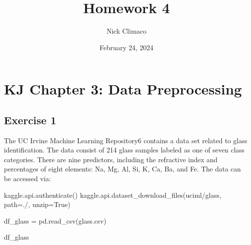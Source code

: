 \documentclass[
  11pt,
]{article}
\title{Homework 4}
\author{Nick Climaco}
\date{February 24, 2024}
\newenvironment{Shaded}{\begin{snugshade}}{\end{snugshade}}
\newcommand{\NormalTok}[1]{\textcolor[rgb]{0.00,0.23,0.31}{#1}}
\newcommand{\OperatorTok}[1]{\textcolor[rgb]{0.37,0.37,0.37}{#1}}
\newcommand{\StringTok}[1]{\textcolor[rgb]{0.13,0.47,0.30}{#1}}
\newcommand{\VariableTok}[1]{\textcolor[rgb]{0.07,0.07,0.07}{#1}}
\renewcommand*\contentsname{Table of contents}
\newcommand\contentsname{Table of contents}
\begin{document}
\maketitle

\renewcommand*\contentsname{Table of contents}
{
\hypersetup{linkcolor=}
\setcounter{tocdepth}{3}
\tableofcontents
}
\section{KJ Chapter 3: Data
Preprocessing}\label{kj-chapter-3-data-preprocessing}

\subsection{Exercise 1}\label{exercise-1}

The UC Irvine Machine Learning Repository6 contains a data set related
to glass identification. The data consist of 214 glass samples labeled
as one of seven class categories. There are nine predictors, including
the refractive index and percentages of eight elements: Na, Mg, Al, Si,
K, Ca, Ba, and Fe. The data can be accessed via:

\begin{Shaded}
\begin{Highlighting}[]
\NormalTok{kaggle.api.authenticate()}
\NormalTok{kaggle.api.dataset\_download\_files(}\StringTok{\textquotesingle{}uciml/glass\textquotesingle{}}\NormalTok{, path}\OperatorTok{=}\StringTok{\textquotesingle{}./\textquotesingle{}}\NormalTok{, unzip}\OperatorTok{=}\VariableTok{True}\NormalTok{)}
\end{Highlighting}
\end{Shaded}

\begin{Shaded}
\begin{Highlighting}[]
\NormalTok{df\_glass }\OperatorTok{=}\NormalTok{ pd.read\_csv(}\StringTok{\textquotesingle{}glass.csv\textquotesingle{}}\NormalTok{)}

\NormalTok{df\_glass}
\end{Highlighting}
\end{Shaded}
\end{document}
